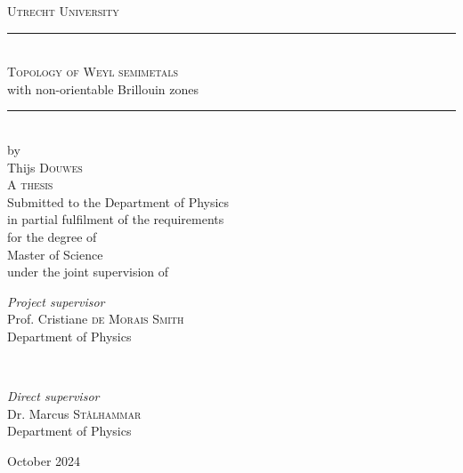 \documentclass[11pt,a4paper]{report}
\theoremstyle{definition}
\theoremstyle{remark}
\newcommand{\?}{\stackrel{?}{=}}
\begin{document}
	
\begin{titlepage}  %
	\center
	
	\textsc{\LARGE Utrecht University}\\[1.5cm]  %
	
	
	\rule{\linewidth}{0.5mm}\\[0.4cm]
	
	{\Huge\textsc{Topology of Weyl semimetals}\\[.2cm] \huge  with non-orientable Brillouin zones}\\[0.4cm] %
	
	\rule{\linewidth}{0.5mm}\\[.8cm]
	
	
	{\large by}\\[.8cm]
	
	
	{\LARGE Thijs \textsc{Douwes}}\\[1.1cm]
	
	
	
	{\Large \textsc{A thesis}}\\[.8cm]
	
	
	{\large Submitted to the Department of Physics}\\[.1cm]
	{\large in partial fulfilment of the requirements}\\[.1cm]
	{\large for the degree of}\\[.5cm]
	
	{\Large Master of Science}\\[.9cm]
	
	
	{\large under the joint supervision of}\\[1cm]
	
	
	\begin{minipage}{0.45\textwidth}
		\begin{flushleft}
			\large
			\textit{Project supervisor}\\
			Prof. Cristiane \textsc{de Morais Smith}\\
			\normalsize Department of Physics
		\end{flushleft}
	\end{minipage}
	~
	\begin{minipage}{0.45\textwidth}
		\begin{flushright}
			\large
			\textit{Direct supervisor}\\
			Dr. Marcus \textsc{St{\aa}lhammar}\\
			\normalsize Department of Physics
		\end{flushright}
	\end{minipage}
	
	
	\vfill\vfill\vfill  %
	
	{\large October 2024}  %
	
	\vfill  %
\end{titlepage}
\setcounter{page}{2}  %
	
\end{document}
